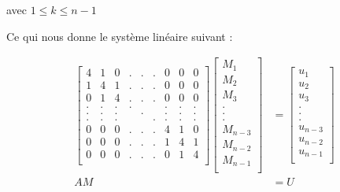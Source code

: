 \documentclass{article}
\begin{document}
\begin{enumerate}
    avec $1 \le k \le n - 1$ \newline \newline

    Ce qui nous donne le système linéaire suivant :

    \begin{equation*}
      \begin{split}
        \left[
          \begin{array}{lllllllll}
            4 & 1 & 0 & . & . & . & 0 & 0 & 0 \\
            1 & 4 & 1 & . & . & . & 0 & 0 & 0 \\
            0 & 1 & 4 & . & . & . & 0 & 0 & 0 \\
            . & . & . & . &   &   & . & . & . \\
            . & . & . &   & . &   & . & . & . \\
            . & . & . &   &   & . & . & . & . \\
            0 & 0 & 0 & . & . & . & 4 & 1 & 0 \\
            0 & 0 & 0 & . & . & . & 1 & 4 & 1 \\
            0 & 0 & 0 & . & . & . & 0 & 1 & 4 \\
          \end{array}
          \right]
        \left[
          \begin{array}{l}
            M_1 \\
            M_2 \\
            M_3 \\
            .   \\
            .   \\
            .   \\
            M_{n-3} \\
            M_{n-2} \\
            M_{n-1} \\
          \end{array}
          \right]
        & =
        \left[
          \begin{array}{l}
            u_1 \\
            u_2 \\
            u_3 \\
            .   \\
            .   \\
            .   \\
            u_{n-3} \\
            u_{n-2} \\
            u_{n-1} \\
          \end{array}
          \right] \\
        AM &= U
      \end{split}
    \end{equation*}


\end{enumerate}
\end{document}
